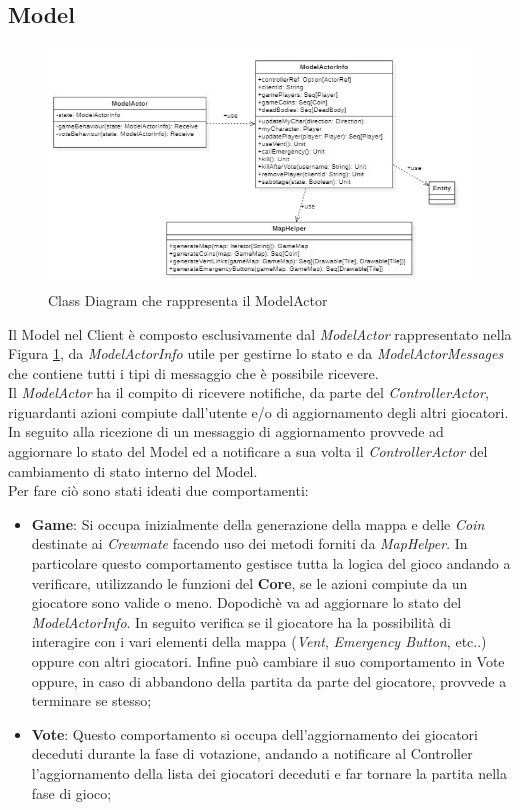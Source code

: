 \subsection{Model}
\begin{figure}[ht]
\centering
\includegraphics[width=\textwidth, scale=0.44]{doc/report/img/Class-diagram-Model.jpeg}
\caption{Class Diagram che rappresenta il ModelActor}
\label{fig:ClasDiagRaprModelAct}
\end{figure}

Il Model nel Client \`e composto esclusivamente dal \textit{ModelActor} rappresentato nella Figura \ref{fig:ClasDiagRaprModelAct}, da \textit{ModelActorInfo} utile per gestirne lo stato e da \textit{ModelActorMessages} che contiene tutti i tipi di messaggio che \`e possibile ricevere.\\
Il \textit{ModelActor} ha il compito di ricevere notifiche, da parte del \textit{ControllerActor}, riguardanti azioni compiute dall'utente e/o di aggiornamento degli altri giocatori. In seguito alla ricezione di un messaggio di aggiornamento provvede ad aggiornare lo stato del Model ed a notificare a sua volta il \textit{ControllerActor} del cambiamento di stato interno del Model.\\
Per fare ci\`o sono stati ideati due comportamenti:
\begin{itemize}
    \item \textbf{Game}: Si occupa inizialmente della generazione della mappa e delle \textit{Coin} destinate ai \textit{Crewmate} facendo uso dei metodi forniti da \textit{MapHelper}. In particolare questo comportamento gestisce tutta la logica del gioco andando a verificare, utilizzando le funzioni del \textbf{Core}, se le azioni compiute da un giocatore sono valide o meno. Dopodich\`e va ad aggiornare lo stato del \textit{ModelActorInfo}. In seguito verifica se il giocatore ha la possibilit\`a di interagire con i vari elementi della mappa (\textit{Vent}, \textit{Emergency Button}, etc..) oppure con altri giocatori. Infine pu\`o cambiare il suo comportamento in Vote oppure, in caso di abbandono della partita da parte del giocatore, provvede a terminare se stesso;
    \item \textbf{Vote}: Questo comportamento si occupa dell'aggiornamento dei giocatori deceduti durante la fase di votazione, andando a notificare al Controller l'aggiornamento della lista dei giocatori deceduti e far tornare la partita nella fase di gioco;
\end{itemize}

